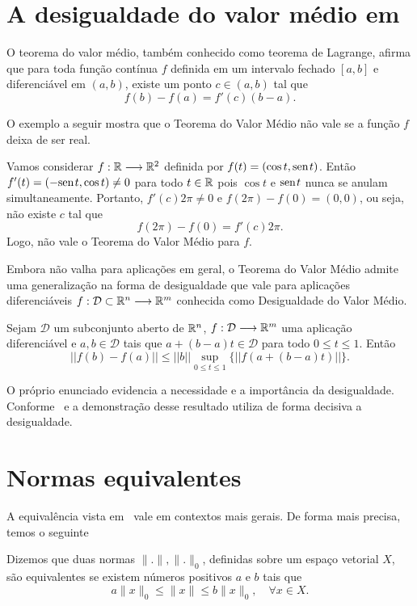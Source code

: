\documentclass[glenn,refnum,codigo]{Estilo}
\begin{document}
\section{A desigualdade do valor médio em \texorpdfstring{\rn}{}}
O teorema do valor médio, também conhecido como teorema de Lagrange, afirma que
para toda função contínua $f$ definida em um intervalo fechado $[a,b]$ e
diferenciável em $(a,b)$, existe um ponto $c\in(a,b)$ tal que
\[
f(b)-f(a)=f'(c)(b-a).
\]

O exemplo a seguir mostra que o Teorema do Valor Médio não vale se a função $f$
deixa de ser real.

\begin{exemplo} Vamos considerar $f:\R \longrightarrow \rn[2]$ definida por $f(t) =
	(\cos t, \sen t)$. Então
	$f'(t) = (-\sen t, \cos t)\neq 0$ para todo $t\in\R$ pois $\cos t$ e $\sen t$
	nunca se anulam
	simultaneamente. Portanto, $f'(c)2\pi\neq 0$ e $f(2\pi)-f(0)=(0,0)$, ou seja,
	não existe $c$
	tal que
	\[
	f(2\pi)-f(0) = f'(c)2\pi.
	\]
	Logo, não vale o Teorema do Valor Médio para $f$.
\end{exemplo}

Embora não valha para aplicações em geral, o Teorema do Valor Médio admite uma
generalização na forma de
desigualdade que vale para aplicações diferenciáveis $f:\mathcal{D}\subset\rn
\longrightarrow \rn[m]$ conhecida como
Desigualdade do Valor Médio.

\begin{teorema}
	Sejam $\mathcal{D}$ um subconjunto aberto de $\rn$, $f:\mathcal{D}
	\longrightarrow \rn[m]$ uma
	aplicação diferenciável e $a,b\in\mathcal{D}$ tais que
	$a+(b-a)t\in\mathcal{D}$ para todo
	$0\leq{t}\leq1$. Então
	\[
	||f(b) - f(a)|| \leq ||b||\sup_{0\leq{t}\leq1}\{||f(a+(b-a)t)||\}.
	\]
\end{teorema}

O próprio enunciado evidencia a necessidade e a importância da desigualdade.
Conforme~\cite{Elon} e \cite{Elon2} a demonstração desse resultado utiliza de
forma decisiva a desigualdade.

\section{Normas equivalentes}

A equivalência vista em \rn\ vale em contextos mais gerais. De forma mais
precisa, temos o seguinte

\begin{define}
	Dizemos que duas normas $\|.\|,\|.\|_0$, definidas sobre um espaço vetorial
	$X$, são equivalentes se existem números positivos $a$ e $b$ tais que
	\[
	a \|x\|_0 \leqslant \| x \| \leqslant b \|x\|_0,\quad \forall x\in X.
	\]
\end{define}
\end{document}
